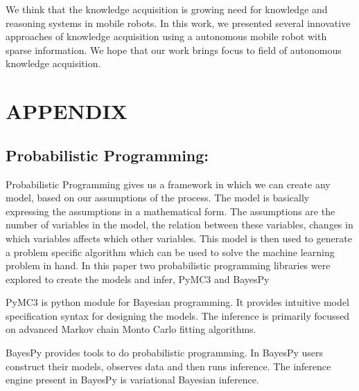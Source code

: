 \documentclass[a4paper, 10pt, conference]{ieeeconf}      %
\begin{document}
We think that the knowledge acquisition is growing need for knowledge and reasoning systems in mobile robots. In this work, we presented several innovative approaches of knowledge acquisition using a autonomous mobile robot with sparse information.   We  hope  that  our  work brings focus to field of autonomous knowledge acquisition.
\addtolength{\textheight}{-12cm}   %




\section*{APPENDIX}
\subsection*{Probabilistic Programming: }
Probabilistic Programming gives us a framework in which we can create any model, based on our assumptions of the process. The model is basically expressing the assumptions in a mathematical form. The assumptions are the number of variables in the model, the relation between these variables, changes in which variables affects which other variables. This model is then used to generate a problem specific algorithm which can be used to solve the machine learning problem in hand. 
In this paper two probabilistic programming libraries were explored to create the models and infer, PyMC3\cite{c9} and BayesPy\cite{c10}

PyMC3 is python module for Bayesian programming. It provides intuitive model specification syntax for designing the models. The inference is primarily focussed on advanced Markov chain Monto Carlo fitting algorithms.

BayesPy provides tools to do probabilistic programming. In BayesPy users construct their models, observes data and then runs inference. The inference engine present in BayesPy is variational Bayesian inference.
\end{document}
